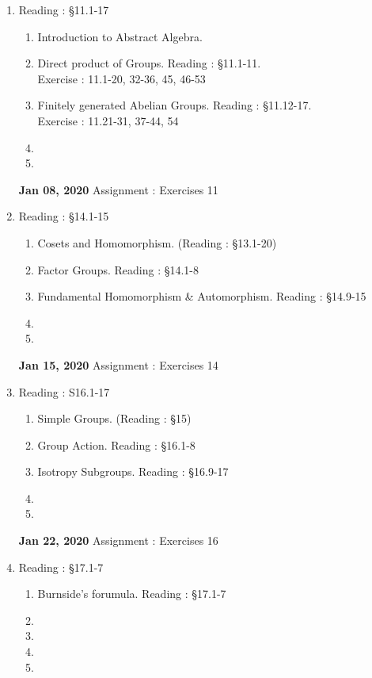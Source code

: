 \begin{enumerate}[label=Week \arabic*]
	\item Reading : \S11.1-17
		\begin{enumerate}[label=Day \arabic*]
			\item Introduction to Abstract Algebra.
			\item Direct product of Groups. Reading : \S11.1-11.\\ Exercise : 11.1-20, 32-36, 45, 46-53
			\item Finitely generated Abelian Groups. Reading : \S11.12-17.\\ Exercise : 11.21-31, 37-44, 54
			\item
			\item
		\end{enumerate}
		\textbf{Jan 08, 2020} Assignment : Exercises 11
	\item Reading : \S14.1-15
		\begin{enumerate}[label=Day \arabic*]
			\item Cosets and Homomorphism. (Reading : \S13.1-20)
			\item Factor Groups. Reading : \S14.1-8
			\item Fundamental Homomorphism \& Automorphism. Reading : \S14.9-15
			\item
			\item
		\end{enumerate}
		\textbf{Jan 15, 2020} Assignment : Exercises 14
	\item Reading : S16.1-17
		\begin{enumerate}[label=Day \arabic*]
			\item Simple Groups. (Reading : \S15)
			\item Group Action. Reading : \S16.1-8
			\item Isotropy Subgroups. Reading : \S16.9-17
			\item 
			\item
		\end{enumerate}
		\textbf{Jan 22, 2020} Assignment : Exercises 16
	\item Reading : \S17.1-7
		\begin{enumerate}[label=Day \arabic*]
			\item Burnside's forumula. Reading : \S17.1-7
			\item
			\item
			\item
			\item
		\end{enumerate}

\end{enumerate}
